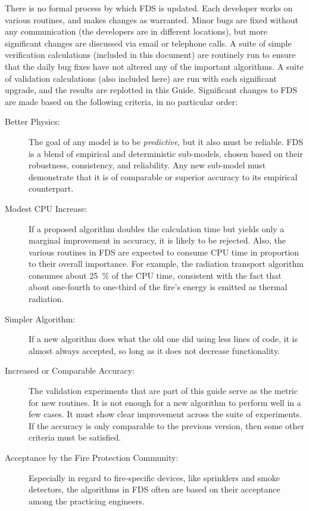 \documentclass[11pt]{book}
\begin{document}
There is no formal process by which FDS is updated. Each developer
works on various routines, and makes changes as warranted. Minor bugs
are fixed without any communication (the developers are in different
locations), but more significant changes are discussed via email or
telephone calls. A suite of simple verification calculations (included
in this document) are routinely run to ensure that the daily bug fixes
have not altered any of the important algorithms. A suite of
validation calculations (also included here) are run with each
significant upgrade, and the results are replotted in this Guide.
Significant changes to FDS are made based on the following criteria, in no particular order:
\begin{description}
\item[Better Physics:] The goal of any model is to be {\em predictive}, but it also must be reliable. FDS is a blend of empirical and
deterministic sub-models, chosen based on their robustness, consistency, and reliability. Any new sub-model must demonstrate that it is
of comparable or superior accuracy to its empirical counterpart.
\item[Modest CPU Increase:] If a proposed algorithm doubles the calculation time but yields only a marginal improvement in accuracy, it is
likely to be rejected. Also, the various routines in FDS are expected to consume CPU time in proportion to their overall importance. For example,
the radiation transport algorithm consumes about 25~\% of the CPU time, consistent with the fact that about one-fourth to one-third of the
fire's energy is emitted as thermal radiation.
\item[Simpler Algorithm:] If a new algorithm does what the old one did using less lines of code, it is almost always accepted, so long as
it does not decrease functionality.
\item[Increased or Comparable Accuracy:] The validation experiments that are part of this guide serve as the metric for new routines. It is
not enough for a new algorithm to perform well in a few cases. It must show clear improvement across the suite of experiments. If the
accuracy is only comparable to the previous version, then some other criteria must be satisfied.
\item[Acceptance by the Fire Protection Community:] Especially in regard to fire-specific devices, like sprinklers and smoke detectors, the
algorithms in FDS often are based on their acceptance among the practicing engineers.
\end{description}
\end{document}
